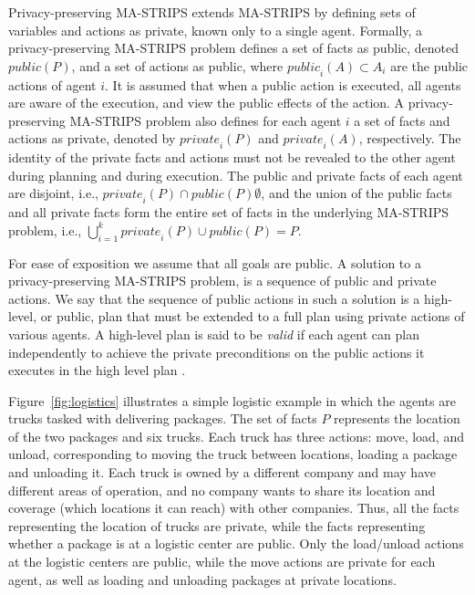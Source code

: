 \documentclass[letterpaper]{article}
\newcommand{\private}{\textit{private}}
\newcommand{\public}{\textit{public}}
\theoremstyle{definition}
\begin{document}
Privacy-preserving MA-STRIPS extends MA-STRIPS by defining sets of variables and actions as private, known only to a single agent. Formally, 
a privacy-preserving MA-STRIPS problem defines a set of facts as public, denoted $\public(P)$, and a set of actions as public, where $\public_i(A) \subset A_i$ are the public actions of agent $i$. 
It is assumed that when a public action is executed, all agents are aware of the execution, and view the public effects of the action. 
A privacy-preserving MA-STRIPS problem also defines for each agent $i$ a set of facts and actions as private, denoted by $\private_i(P)$ and $\private_i(A)$, respectively. The identity of the private facts and actions must not be revealed to the other agent during planning and during execution. The public and private facts of each agent are disjoint, i.e., $\private_i(P)\cap \public(P)\emptyset$, and the union of the public facts and all private facts form the entire set of facts in the underlying MA-STRIPS problem, i.e., $\bigcup_{i=1}^k \private_i(P) \cup \public(P)=P$.

For ease of exposition we assume that all goals are public.
A solution to a privacy-preserving MA-STRIPS problem, is a sequence of public and private actions. We say that the sequence of public actions in such a solution is a high-level, or public, plan that must be extended to a full plan using private actions of various agents. A high-level plan is said to be {\em valid} if each agent can plan independently to achieve the private preconditions on the public actions it executes in the high level plan \cite{maliah2014privacyPreserving}.

Figure~\ref{fig:logistics} illustrates a simple logistic example in which the agents are trucks tasked with delivering packages. The set of facts $P$ represents the location of the two packages and six trucks. Each truck has three actions: move, load, and unload, corresponding to moving the truck between locations, loading a package and unloading it. 
Each truck is owned by a different company and may have different areas of operation, and no company wants to share its location and coverage (which locations it can reach) with other companies. Thus, all the facts representing the location of trucks are private, while the facts representing whether a package is at a logistic center are public. Only the load/unload actions at the logistic centers are public, while the move actions are private for each agent, as well as loading and unloading packages at private locations.  
\end{document}
